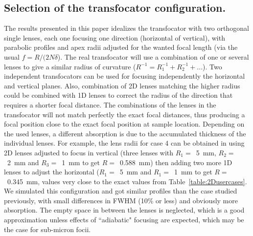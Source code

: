\documentclass{iucr}              %
\begin{document}
\subsection{Selection of the transfocator configuration.} 
The results presented in this paper idealizes the transfocator with two orthogonal single lenses, each one focusing one direction (horizontal of vertical), with parabolic profiles and apex radii adjusted for the wanted focal length (via the usual $f=R/(2 N \delta$). The real transfocator will use a combination of one or several lenses to give a similar radius of curvature  ($R^{-1} = R_1^{-1} + R_2^{-1} + ...$). Two independent transfocators can be used for focusing independently the horizontal and vertical planes. Also, combination of 2D lenses matching the higher radius could be combined with 1D lenses to correct the radius of the direction that requires a shorter focal distance. The combinations of the lenses in the transfocator will not match perfectly the exact focal distances, thus producing a focal position close to the exact focal position at sample location. Depending on the used lenses, a different absorption is due to the accumulated thickness of the individual lenses. For example, the lens radii for case 4 can be obtained in using 2D lenses adjusted to focus in vertical (three lenses with $R_1=$~\SI{5}{\milli\meter}, $R_2=$~\SI{2}{\milli\meter} and $R_3=$~\SI{1}{\milli\meter} to get $R=$~\SI{0.588}{\milli\meter}) then adding two more 1D lenses to adjust the horizontal ($R_1=$~\SI{5}{\milli\meter} and $R_1=$~\SI{1}{\milli\meter} to get $R=$~\SI{0.345}{\milli\meter}, values very close to the exact values from Table~\ref{table:2Dusercases}. We simulated this configuration and got similar profiles than the case studied previously, with small differences in FWHM (10\% or less) and obviously more absorption. The empty space in between the lenses is neglected, which is a good approximation unless effects of ``adiabatic" focusing are expected, which may be the case for sub-micron focii.    
\end{document}
